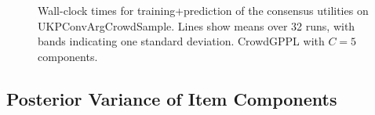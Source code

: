 \begin{figure}
\captionsetup{justification=centering}
\caption{
    Wall-clock times for training+prediction of the consensus utilities 
    on UKPConvArgCrowdSample. Lines show means over 32 runs,
    with bands indicating one standard deviation. CrowdGPPL with $C=5$ components.
}
\end{figure}

\subsection{Posterior Variance of Item Components}
\label{sec:components}

